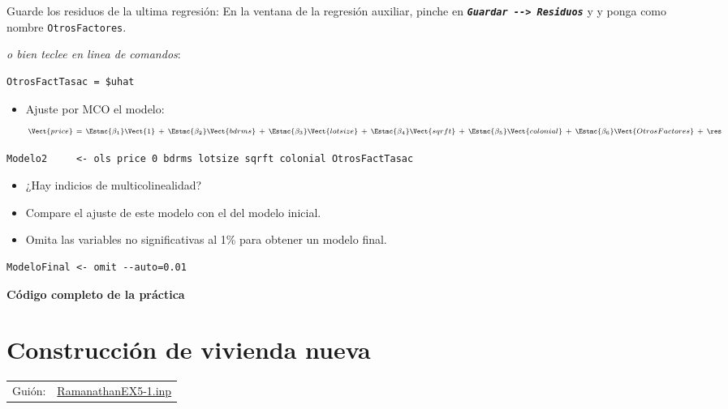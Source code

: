 \documentclass[11pt]{article}
\begin{document}
Guarde los residuos de la ultima regresión: En la ventana de la
regresión auxiliar, pinche en \textbf{\emph{\texttt{Guardar -{}-> Residuos}}} y y ponga
como nombre \texttt{OtrosFactores}.

{\vspace{0pt} \color{gray!70!black}
\emph{o bien teclee en linea de comandos}:
\begin{verbatim}
OtrosFactTasac = $uhat
\end{verbatim}
}

\begin{itemize}
\item Ajuste por MCO el modelo:
\begin{displaymath}
  \scriptstyle
  \Vect{price}\ = \
       \Estmc{\beta_1}\Vect{1} 
  \ +\ \Estmc{\beta_2}\Vect{bdrms}
  \ +\ \Estmc{\beta_3}\Vect{lotsize}
  \ +\ \Estmc{\beta_4}\Vect{sqrft}
  \ +\ \Estmc{\beta_5}\Vect{colonial}
  \ +\ \Estmc{\beta_6}\Vect{OtrosFactores} \ +\ \res
\end{displaymath}
\end{itemize}

{\vspace{0pt} \color{gray!70!black}
\begin{verbatim}
Modelo2     <- ols price 0 bdrms lotsize sqrft colonial OtrosFactTasac
\end{verbatim}
}


\begin{itemize}
\item ¿Hay indicios de multicolinealidad?

\item Compare el ajuste de este modelo con el del modelo inicial.

\item Omita las variables no significativas al 1\% para obtener un modelo final.
\end{itemize}

{\vspace{0pt} \color{gray!70!black}
\begin{verbatim}
ModeloFinal <- omit --auto=0.01
\end{verbatim}
}

\vspace{10pt}
\noindent
\textbf{Código completo de la práctica}
\vspace{10pt}

\clearpage


\section{Construcción de vivienda nueva}
\label{sec:org7f5aa1a}
\begin{center}
\begin{tabular}{ll}
Guión: & \href{https://github.com/mbujosab/Ectr/tree/master/Practicas/Gretl/scripts/RamanathanEX5-1.inp}{RamanathanEX5-1.inp}\\
\end{tabular}
\end{center}
\end{document}
